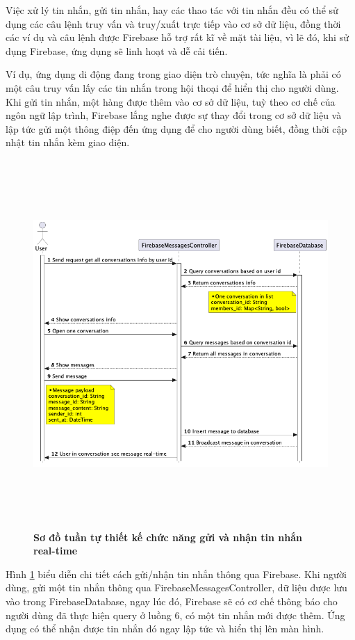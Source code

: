 Việc xử lý tin nhắn, gửi tin nhắn, hay các thao tác với tin nhắn đều có thể sử dụng các câu lệnh truy vấn và truy/xuất
trực tiếp vào cơ sở dữ liệu, đồng thời các ví dụ và câu lệnh được Firebase hỗ trợ rất kĩ về mặt tài liệu, vì lẽ đó, khi sử dụng
Firebase, ứng dụng sẽ linh hoạt và dễ cải tiến.

Ví dụ, ứng dụng di động đang trong giao diện trò chuyện, tức nghĩa là phải có một câu truy vấn lấy các tin nhắn trong hội thoại
để hiển thị cho người dùng. Khi gửi tin nhắn, một hàng được thêm vào
cơ sở dữ liệu, tuỳ theo cơ chế của ngôn ngữ lập trình, Firebase lắng nghe được sự thay đổi
trong cơ sở dữ liệu và lập tức gửi một thông điệp đến ứng dụng để cho người dùng biết, đồng thời cập nhật tin nhắn kèm giao diện.

\begin{figure}[H]
  \centering
  \includegraphics[width=16cm,height=14cm]{Images/mobile_app/design_send_receive_message.png}
  \caption[Sơ đồ tuần tự thiết kế chức năng gửi và nhận tin nhắn real-time]{\bfseries \fontsize{12pt}{0pt}
  \selectfont Sơ đồ tuần tự thiết kế chức năng gửi và nhận tin nhắn real-time}
  \label{design_send_receive_firebase_message} %
\end{figure}

Hình \ref{design_send_receive_firebase_message} biểu diễn chi tiết cách gửi/nhận tin nhắn thông qua Firebase. Khi người dùng,
gửi một tin nhắn thông qua FirebaseMessagesController, dữ liệu được lưu vào trong FirebaseDatabase, ngay lúc đó, Firebase sẽ có
cơ chế thông báo cho người dùng đã thực hiện query ở luồng 6, có một tin nhắn mới được thêm. Ứng dụng có thể nhận được tin nhắn
đó ngay lập tức và hiển thị lên màn hình.

